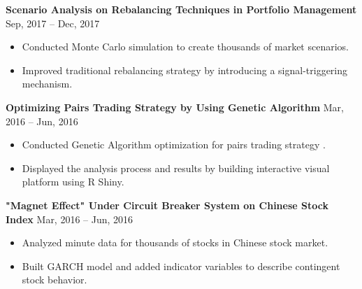 \documentclass[a4paper,12pt]{report}
\newcommand{\marginAdj}{0.5in}
\begin{document}
\noindent
\textbf{Scenario Analysis on Rebalancing Techniques in Portfolio Management }  \hspace*{\marginAdj}  \hspace*{0.05in} {\fontsize{12pt}{12pt}\selectfont Sep, 2017 – Dec, 2017} \par
\noindent 
\begin{itemize}[noitemsep,topsep=0pt]
	\item {\fontsize{12pt}{12pt}\selectfont Conducted Monte Carlo simulation to create thousands of market scenarios.} \par
	\item {\fontsize{12pt}{12pt}\selectfont Improved traditional rebalancing strategy by introducing a signal-triggering mechanism.} \par
\end{itemize}


\noindent 
\textbf{Optimizing Pairs Trading Strategy by Using Genetic Algorithm} \hspace*{0.65in}  \hspace*{\marginAdj} {\fontsize{12pt}{12pt}\selectfont  Mar, 2016 – Jun, 2016} \par
\noindent 
\begin{itemize}[noitemsep,topsep=0pt]
\item {\fontsize{12pt}{12pt}\selectfont Conducted Genetic Algorithm optimization for pairs trading strategy .}
\item {\fontsize{12pt}{12pt}\selectfont Displayed the analysis process and results by building interactive visual platform using R Shiny.}
\end{itemize}

\noindent 
\textbf{"Magnet Effect" Under Circuit Breaker System on Chinese Stock Index} \hspace*{0.10in}\hspace*{\marginAdj} {\fontsize{12pt}{12pt}\selectfont Mar, 2016 – Jun, 2016} \par
\noindent 
\begin{itemize}[noitemsep,topsep=0pt]
	\item {\fontsize{12pt}{12pt}\selectfont Analyzed minute data for thousands of stocks in Chinese stock market.} \par
	\item {\fontsize{12pt}{12pt}\selectfont Built GARCH model and added indicator variables to describe contingent stock behavior.} \par
\end{itemize}
\end{document}
